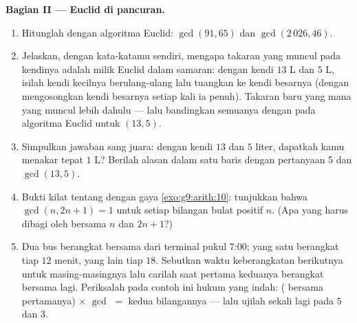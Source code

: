 \begin{problem}
\medskip
\noindent\textbf{Bagian II --- Euclid di pancuran.}
\begin{enumerate}[resume]
  \item Hitunglah dengan algoritma Euclid: $\gcd(91, 65)$ dan
        $\gcd(2\,026, 46)$.
  \item Jelaskan, dengan kata-katamu sendiri, mengapa takaran yang
        muncul pada kendinya adalah  milik Euclid dalam samaran:
        dengan kendi $13$ L dan $5$ L, isilah kendi kecilnya
        berulang-ulang lalu tuangkan ke kendi besarnya (dengan
        mengosongkan kendi besarnya setiap kali ia penuh). Takaran
        baru yang mana yang muncul lebih dahulu --- lalu bandingkan
        semuanya dengan  pada algoritma Euclid
        untuk $(13, 5)$.
  \item Simpulkan jawaban sang juara: dengan kendi $13$ dan $5$
        liter, dapatkah kamu menakar tepat $1$ L? Berilah alasan
        dalam satu baris dengan pertanyaan 5 dan $\gcd(13, 5)$.
  \item Bukti kilat tentang  dengan gaya
        \cref{exo:g9:arith:10}: tunjukkan bahwa $\gcd(n, 2n + 1) = 1$
        untuk setiap bilangan bulat positif $n$. (Apa yang harus
        dibagi oleh  bersama $n$ dan $2n + 1$?)
  \item Dua bus berangkat bersama dari terminal pukul 7:00; yang satu
        berangkat tiap $12$ menit, yang lain tiap $18$. Sebutkan
        waktu keberangkatan berikutnya untuk masing-masingnya lalu
        carilah saat pertama keduanya berangkat bersama lagi.
        Periksalah pada contoh ini hukum yang indah: (
        bersama pertamanya) $\times$
        $\gcd$ $=$  kedua bilangannya --- lalu ujilah
        sekali lagi pada $5$ dan $3$.
\end{enumerate}


\end{problem}
